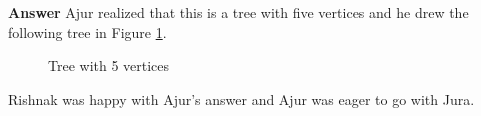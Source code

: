 \textbf{Answer} Ajur realized that this is a tree with five vertices and he drew the following tree in Figure \ref{6q1}.
\begin{figure}
\begin{center}


\caption{Tree with 5 vertices}\label{6q1}
\end{center}
\end{figure}

Rishnak was happy with Ajur's answer and Ajur was eager to go with Jura.